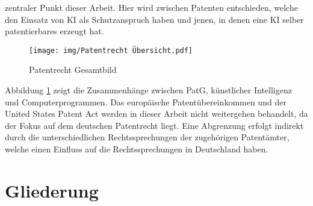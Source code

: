 zentraler Punkt dieser Arbeit. Hier wird zwischen
Patenten entschieden, welche den Einsatz von KI
als Schutzanspruch haben und jenen, in denen eine
KI selber patentierbares erzeugt hat.
\begin{figure}[htb]
  \centering
  \texttt{[image: img/Patentrecht Übersicht.pdf]}\\
  \caption{Patentrecht Gesamtbild}\label{fig:patentrecht}
\end{figure}
Abbildung \ref{fig:patentrecht} zeigt die Zusammenhänge zwischen PatG, 
künstlicher Intelligenz und Computerprogrammen.
Das europäische Patentübereinkommen und der United States Patent Act 
werden in dieser Arbeit nicht weitergehen behandelt,
da der Fokus auf dem deutschen Patentrecht liegt.
Eine Abgrenzung erfolgt indirekt durch die unterschiedlichen
Rechtssprechungen der zugehörigen Patentämter, welche einen 
Einfluss auf die Rechtssprechungen in Deutschland haben.
\\


\section{Gliederung\label{sec:outline}}


